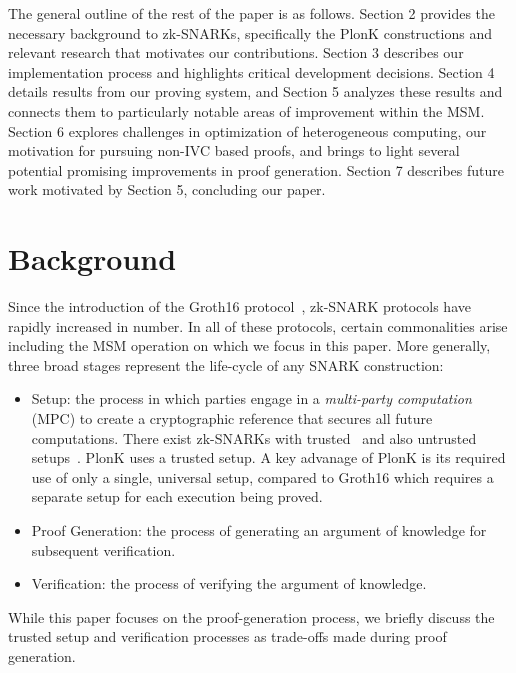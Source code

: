 \documentclass[sigconf]{acmart}
\begin{document}
The general outline of the rest of the paper is as follows.
Section 2 provides the necessary background to zk-SNARKs, specifically the PlonK constructions and relevant research that motivates our contributions. Section 3 describes our implementation process and highlights critical development decisions. Section 4 details results from our proving system, and Section 5 analyzes these results and connects them to particularly notable areas of improvement within the MSM. Section 6 explores challenges in optimization of heterogeneous computing, our motivation for pursuing non-IVC based proofs, and brings to light several potential promising improvements in proof generation. Section 7 describes future work motivated by Section 5, concluding our paper.
\section{Background}
\label{sec:background}
Since the introduction of the Groth16 protocol~\cite{Groth:2016}, zk-SNARK protocols have rapidly increased in number. In all of these protocols, certain commonalities arise including the MSM operation on which
we focus in this paper. More generally, three broad stages represent the life-cycle of any SNARK construction:

\begin{itemize}
    \item Setup: the process in which parties engage in a {\it multi-party computation} (MPC) to create a cryptographic reference that secures all future computations. There exist zk-SNARKs with trusted~\cite{Gabizon2019PlonKPO,Groth:2016} and also untrusted setups~\cite{Dark}. PlonK uses a trusted setup.  A key advanage of PlonK is
    its required use of only a single, universal setup, compared to Groth16 which requires a separate setup for each execution being proved.
    \item Proof Generation: the process of generating an argument of knowledge for subsequent verification.
    \item Verification: the process of verifying the argument of knowledge.
\end{itemize}

While this paper focuses on the proof-generation process, we briefly discuss the trusted setup and verification processes as trade-offs made during proof generation. 
\end{document}
